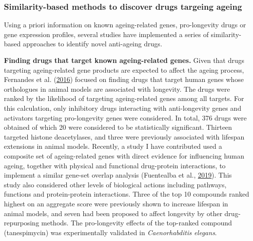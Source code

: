 \documentclass[12pt,twoside]{unicam}
\begin{document}
\hypertarget{drugSimMethods}{%
\subsubsection{Similarity-based methods to discover drugs targeing ageing}\label{drugSimMethods}}

Using a priori information on known ageing-related genes, pro-longevity drugs or gene expression profiles, several studies have implemented a series of similarity-based approaches to identify novel anti-ageing drugs.

\textbf{Finding drugs that target known ageing-related genes.} Given that drugs targeting ageing-related gene products are expected to affect the ageing process, Fernandes et al. (\protect\hyperlink{ref-Fernandes2016}{2016}) focused on finding drugs that target human genes whose orthologues in animal models are associated with longevity. The drugs were ranked by the likelihood of targeting ageing-related genes among all targets. For this calculation, only inhibitory drugs interacting with anti-longevity genes and activators targeting pro-longevity genes were considered. In total, 376 drugs were obtained of which 20 were considered to be statistically significant. Thirteen targeted histone deacetylases, and three were previously associated with lifespan extensions in animal models. Recently, a study I have contributed used a composite set of ageing-related genes with direct evidence for influencing human ageing, together with physical and functional drug-protein interactions, to implement a similar gene-set overlap analysis (Fuentealba et al., \protect\hyperlink{ref-Fuentealba2019}{2019}). This study also considered other levels of biological actions including pathways, functions and protein-protein interactions. Three of the top 10 compounds ranked highest on an aggregate score were previously shown to increase lifespan in animal models, and seven had been proposed to affect longevity by other drug-repurposing methods. The pro-longevity effects of the top-ranked compound (tanespimycin) was experimentally validated in \emph{Caenorhabditis elegans}.
\end{document}
